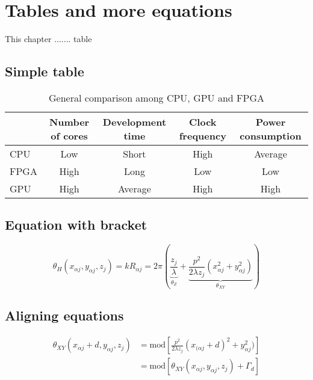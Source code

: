 \chapter{Tables and more equations}
This chapter ....... table
\section{Simple table}
\begin{table}[H]
\caption[General comparison among CPU, GPU and FPGA]{General comparison among CPU, GPU and FPGA \cite{Ito_Review}}
\centering
{}
\label{table:ProsConsHardware}
\begin{adjustbox}{width=\textwidth}
\begin{tabular}{l c c c c}
\toprule
& Number of cores& Development time& Clock frequency & Power consumption\\
\hline
CPU & Low & Short & High & Average \\
FPGA & High & Long & Low & Low \\
GPU & High & Average & High & High\\
\bottomrule
\end{tabular}
\end{adjustbox}
\end{table}

\section{Equation with bracket}
\begin{equation}
	\theta_H(x_{\alpha j}, y_{\alpha j}, z_j) = kR_{\alpha j} = 2\pi\left( \underbrace{\frac{z_j}{\lambda}}_{\theta_Z}+\underbrace{\frac{p^2}{2\lambda z_j}(x_{\alpha j}^2 + y_{\alpha j}^2)}_{\theta_{XY}}\right)
	\label{eq:phaseOfTwoComponents}
\end{equation}
\section{Aligning equations}
\begin{align}
	\theta_{XY}(x_{\alpha j}+d, y_{\alpha j}, z_j) & = \text{mod}[{\frac{p^2}{2\lambda z_j}(x_{(\alpha j}+d)^2 + y_{\alpha j}^2)}] \\
	& = \text{mod}[\theta_{XY}(x_{\alpha j}, y_{\alpha j}, z_j)+\Gamma_d]
\end{align}

